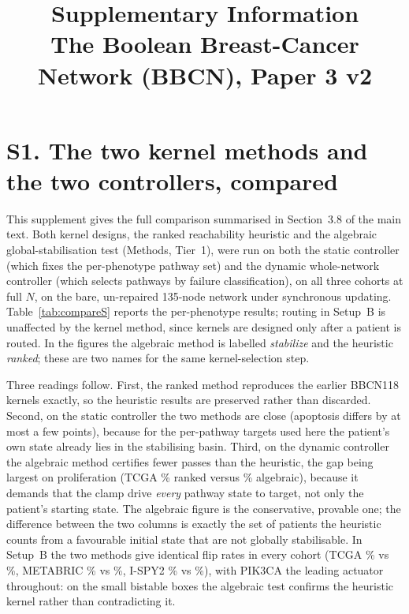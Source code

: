 \documentclass[11pt]{article}
\title{Supplementary Information\\
The Boolean Breast-Cancer Network (BBCN), Paper 3 v2}
\date{}
\begin{document}
\maketitle

\section*{S1. The two kernel methods and the two controllers, compared}

This supplement gives the full comparison summarised in Section~3.8 of the main
text. Both kernel designs, the ranked reachability heuristic and the algebraic
global-stabilisation test (Methods, Tier~1), were run on both the static
controller (which fixes the per-phenotype pathway set) and the dynamic
whole-network controller (which selects pathways by failure classification), on
all three cohorts at full $N$, on the bare, un-repaired 135-node network under
synchronous updating. Table~\ref{tab:compareS} reports the per-phenotype results;
routing in Setup~B is unaffected by the kernel method, since kernels are designed
only after a patient is routed. In the figures the algebraic method is labelled
\emph{stabilize} and the heuristic \emph{ranked}; these are two names for the same
kernel-selection step.

Three readings follow. First, the ranked method reproduces the earlier BBCN118
kernels exactly, so the heuristic results are preserved rather than discarded.
Second, on the static controller the two methods are close (apoptosis differs by
at most a few points), because for the per-pathway targets used here the patient's
own state already lies in the stabilising basin. Third, on the dynamic controller
the algebraic method certifies fewer passes than the heuristic, the gap being
largest on proliferation (TCGA \BBCNACdeRankedTcgaStagepassProliferationOff\%
ranked versus \BBCNACdeStabilizeTcgaStagepassProliferationOff\% algebraic), because
it demands that the clamp drive \emph{every} pathway state to target, not only the
patient's starting state. The algebraic figure is the conservative, provable one;
the difference between the two columns is exactly the set of patients the heuristic
counts from a favourable initial state that are not globally stabilisable. In
Setup~B the two methods give identical flip rates in every cohort (TCGA
\BBCNBKernelRankedTcgaFlipPct\% vs \BBCNBKernelStabilizeTcgaFlipPct\%, METABRIC
\BBCNBKernelRankedMetabricFlipPct\% vs \BBCNBKernelStabilizeMetabricFlipPct\%,
I-SPY2 \BBCNBKernelRankedIspyTwoFlipPct\% vs \BBCNBKernelStabilizeIspyTwoFlipPct\%),
with PIK3CA the leading actuator throughout: on the small bistable boxes the
algebraic test confirms the heuristic kernel rather than contradicting it.
\end{document}
